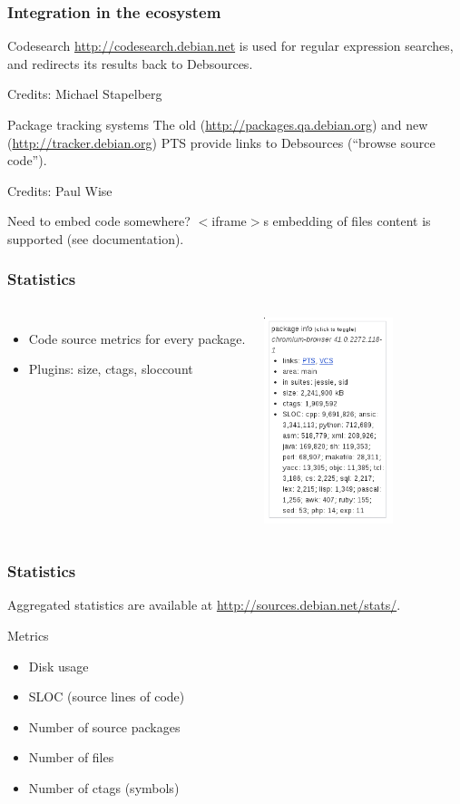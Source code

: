 \documentclass{beamer}
\begin{document}
\begin{frame}
  \frametitle{Integration in the ecosystem}
  \begin{block}{Codesearch}
    \url{http://codesearch.debian.net} is used for regular expression
    searches, and redirects its results back to Debsources.

    Credits: Michael Stapelberg
  \end{block}
  \pause
  \begin{block}{Package tracking systems}
    The old (\url{http://packages.qa.debian.org}) and new
    (\url{http://tracker.debian.org}) PTS provide links to Debsources
    (``browse source code'').

    Credits: Paul Wise
  \end{block}
  \pause
  \begin{block}{Need to embed code somewhere?}
    $<$iframe$>$s embedding of files content is supported (see
    documentation).
  \end{block}
\end{frame}

\begin{frame}
  \frametitle{Statistics}
  \begin{columns}
    \begin{itemize}
    \item Code source metrics for every package.
    \item Plugins: size, ctags, sloccount
    \end{itemize}
    \pause
    
    \includegraphics[height=6cm]{img/screenshot-stats.png}
  \end{columns}
\end{frame}

\begin{frame}
  \frametitle{Statistics}
  Aggregated statistics are available at
  \url{http://sources.debian.net/stats/}.
  \begin{block}{Metrics}
    \begin{itemize}
    \item Disk usage
    \item SLOC (source lines of code)
    \item Number of source packages
    \item Number of files
    \item Number of ctags (symbols)
    \end{itemize}
  \end{block}
\end{frame}
\end{document}
